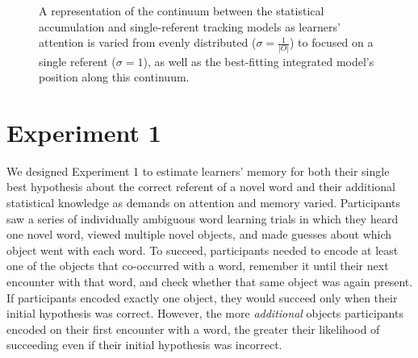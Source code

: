 \documentclass[man,floatsintext]{apa6}
\begin{document}
 \begin{figure}[b]
	\caption{\label{fig:models} A representation of the continuum between the statistical accumulation and single-referent tracking models as learners' attention is varied from evenly distributed ($\sigma=\frac{1}{|O|}$) to focused on a single referent ($\sigma=1$), as well as the best-fitting integrated model's position along this continuum.}
\end{figure}

\section{Experiment 1}

We designed Experiment 1 to estimate learners' memory for both their single best hypothesis about the correct referent of a novel word and their additional statistical knowledge as demands on attention and memory varied. Participants saw a series of individually ambiguous word learning trials in which they heard one novel word, viewed multiple novel objects, and made guesses about which object went with each word. To succeed, participants needed to encode at least one of the objects that co-occurred with a word, remember it until their next encounter with that word, and check whether that same object was again present. If participants encoded exactly one object, they would succeed only when their initial hypothesis was correct. However, the more \emph{additional} objects participants encoded on their first encounter with a word, the greater their likelihood of succeeding even if their initial hypothesis was incorrect. 
\end{document}
